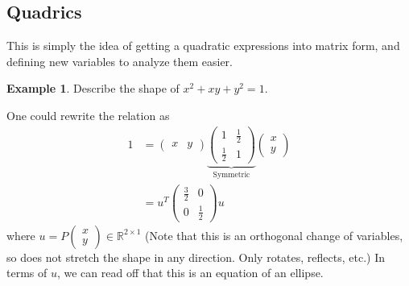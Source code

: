 \documentclass[12pt, a4paper]{article}
\newcommand{\R}{\mathbb{R}}
\theoremstyle{remark}
\theoremstyle{definition}
\newtheorem{example}{Example}
\numberwithin{equation}{section}
\numberwithin{definition}{section}
\numberwithin{example}{section}
\numberwithin{exercise}{section}
\numberwithin{remark}{section}
\numberwithin{figure}{section}
\begin{document}
\subsection{Quadrics}
This is simply the idea of getting a quadratic expressions into matrix form,
and defining new variables to analyze them easier.
\begin{example}
    Describe the shape of $x^2 + xy + y^2 = 1$.

    One could rewrite the relation as
    \begin{align*}
        1 &= 
        \begin{pmatrix}
            x & y
        \end{pmatrix}
        \underbrace{
        \begin{pmatrix}
            1 & \frac{1}{2} \\ \frac{1}{2} & 1
    \end{pmatrix}}_{\text{Symmetric}}
        \begin{pmatrix}
            x \\ y
        \end{pmatrix} \\
        &= u^T
        \begin{pmatrix}
            \frac{3}{2} & 0 \\ 0 & \frac{1}{2}
        \end{pmatrix}
        u
    \end{align*}
    where
        $u = P
        \begin{pmatrix}
            x \\ y
        \end{pmatrix}
        \in \R^{2 \times 1}$
        (Note that this is an orthogonal change of variables, so does not stretch the shape in any direction. Only rotates, reflects, etc.)
        In terms of $u$, we can read off that this is an equation of an ellipse.
\end{example}
\end{document}
